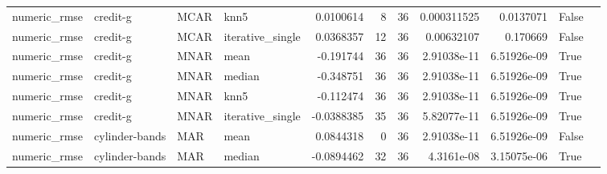 \begin{table}[ht]
\begin{tabular}{llllrrrrrll}
 numeric\_rmse           & credit-g             & MCAR        & knn5             &      0.0100614   &                   8 &      36 & 0.000311525 & 0.0137071   & False              &                                                                                                                    \\
 numeric\_rmse           & credit-g             & MCAR        & iterative\_single &      0.0368357   &                  12 &      36 & 0.00632107  & 0.170669    & False              &                                                                                                                    \\
 numeric\_rmse           & credit-g             & MNAR        & mean             &     -0.191744    &                  36 &      36 & 2.91038e-11 & 6.51926e-09 & True               &                                                                                                                    \\
 numeric\_rmse           & credit-g             & MNAR        & median           &     -0.348751    &                  36 &      36 & 2.91038e-11 & 6.51926e-09 & True               &                                                                                                                    \\
 numeric\_rmse           & credit-g             & MNAR        & knn5             &     -0.112474    &                  36 &      36 & 2.91038e-11 & 6.51926e-09 & True               &                                                                                                                    \\
 numeric\_rmse           & credit-g             & MNAR        & iterative\_single &     -0.0388385   &                  35 &      36 & 5.82077e-11 & 6.51926e-09 & True               &                                                                                                                    \\
 numeric\_rmse           & cylinder-bands       & MAR         & mean             &      0.0844318   &                   0 &      36 & 2.91038e-11 & 6.51926e-09 & False              &                                                                                                                    \\
 numeric\_rmse           & cylinder-bands       & MAR         & median           &     -0.0894462   &                  32 &      36 & 4.3161e-08  & 3.15075e-06 & True               &                                                                                                                    \\

\end{tabular}
\end{table}
